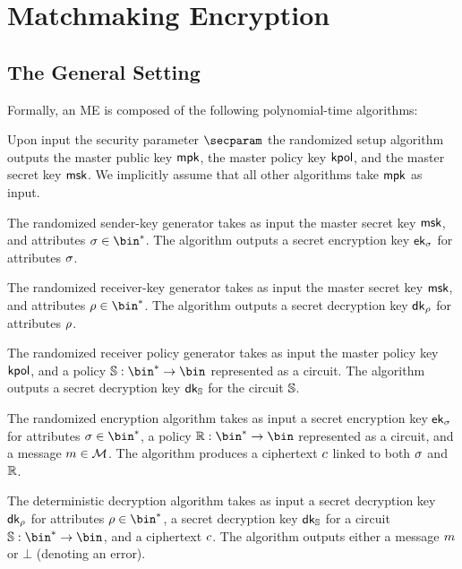 \chapter{Matchmaking Encryption}

\section{The General Setting}
Formally, an ME is composed of the following polynomial-time algorithms:
\begin{description}\label{def:dnish}
    \item[$\setup(\secparam)$:] Upon input the security parameter $\secparam$ the randomized setup algorithm outputs the master public key $\mathsf{mpk}$, the master policy key $\mathsf{kpol}$, and the master secret key $\mathsf{msk}$.
          We implicitly assume that all other algorithms take $\mathsf{mpk}$ as input.
    \item[$\skgen(\msk, \sattr)$:] The randomized sender-key generator takes as input the master secret key $\mathsf{msk}$, and attributes $\sattr\in\bin^*$. The algorithm outputs a secret encryption key $\mathsf{ek}_{\sigma}$ for attributes $\sigma$.
    \item[$\rkgen(\msk, \rattr)$:] The randomized receiver-key generator takes as input the master secret key $\mathsf{msk}$, and attributes $\rattr\in\bin^*$. The algorithm outputs a secret decryption key $\mathsf{dk}_{\rho}$ for attributes $\rho$.
    \item[$\polgen(\kpol, \saccess)$:] The randomized receiver policy generator takes as input the master policy key $\mathsf{kpol}$, and a policy $\saccess:\allowbreak\bin^*\rightarrow\bin$ represented as a circuit. The algorithm outputs a secret decryption key $\mathsf{dk}_{\mathbb{S}}$ for the circuit $\mathbb{S}$.
    \item[$\enc(\ek_{\sattr}, \raccess, \msg)$:] The randomized encryption algorithm takes as input a secret encryption key $\mathsf{ek}_{\sigma}$ for attributes $\sattr \in \bin^*$, a policy $\raccess:\bin^*\rightarrow\bin$ represented as a circuit, and a message $m\in\mathcal{M}$. The algorithm produces a ciphertext $c$ linked to both $\sigma$ and $\mathbb{R}$.
    \item[$\dec(\dk_{\rattr}, \dk_{\saccess}, \cipher)$:] The deterministic decryption algorithm takes as input a secret decryption key $\mathsf{dk}_{\rho}$ for attributes $\rattr \in \bin^*$, a secret decryption key $\mathsf{dk}_{\mathbb{S}}$ for a circuit $\saccess:\bin^*\rightarrow\bin$, and a ciphertext $c$.
          The algorithm outputs either a message $m$ or  $\bot$ (denoting an error).
\end{description}

